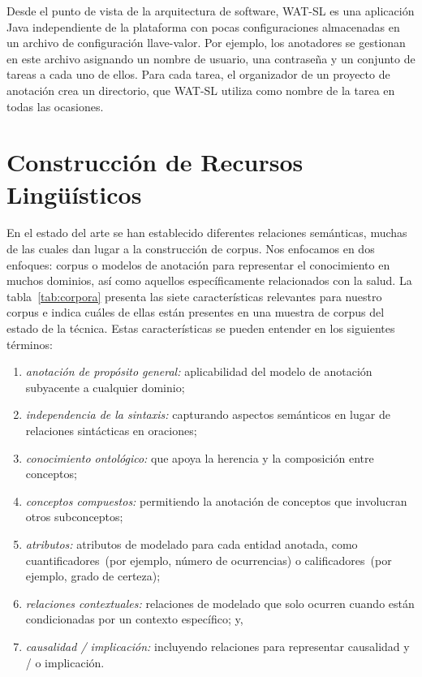 Desde el punto de vista de la arquitectura de software, WAT-SL es una aplicación Java independiente de la plataforma con pocas configuraciones almacenadas en un archivo de configuración llave-valor.
Por ejemplo, los anotadores se gestionan en este archivo asignando un nombre de usuario, una contraseña y un conjunto de tareas a cada uno de ellos.
Para cada tarea, el organizador de un proyecto de anotación crea un directorio, que WAT-SL utiliza como nombre de la tarea en todas las ocasiones.

\section{Construcción de Recursos Lingüísticos}

En el estado del arte se han establecido diferentes relaciones semánticas, muchas de las cuales dan lugar a la construcción de corpus. Nos enfocamos en dos enfoques: corpus o modelos de anotación para representar el conocimiento en muchos dominios, así como aquellos específicamente relacionados con la salud.
La tabla~\ref{tab:corpora} presenta las siete características relevantes para nuestro corpus e indica cuáles de ellas están presentes en una muestra de corpus del estado de la técnica.
Estas características se pueden entender en los siguientes términos:

\begin{enumerate}
  \item \textit{anotación de propósito general:} aplicabilidad del modelo de anotación subyacente a cualquier dominio;
  \item \textit{independencia de la sintaxis:} capturando aspectos semánticos en lugar de relaciones sintácticas en oraciones;
  \item \textit{conocimiento ontológico:} que apoya la herencia y la composición entre conceptos;
  \item \textit{conceptos compuestos:} permitiendo la anotación de conceptos que involucran otros subconceptos;
  \item \textit{atributos:} atributos de modelado para cada entidad anotada, como cuantificadores~(por ejemplo, número de ocurrencias) o calificadores~(por ejemplo, grado de certeza);
  \item \textit{relaciones contextuales:} relaciones de modelado que solo ocurren cuando están condicionadas por un contexto específico; y,
  \item \textit{causalidad / implicación:} incluyendo relaciones para representar causalidad y / o implicación.
\end{enumerate}

